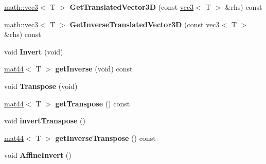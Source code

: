 \begin{DoxyCompactItemize}
\item 
\hypertarget{classmath_1_1mat44_ab01b2b5b923321768db4322b8b9c96cb}{
\hyperlink{classmath_1_1vec3}{math::vec3}$<$ T $>$ {\bfseries GetTranslatedVector3D} (const \hyperlink{classmath_1_1vec3}{vec3}$<$ T $>$ \&rhs) const }
\label{classmath_1_1mat44_ab01b2b5b923321768db4322b8b9c96cb}

\item 
\hypertarget{classmath_1_1mat44_ac1150e292e3e7640ae856c1918d26f4b}{
\hyperlink{classmath_1_1vec3}{math::vec3}$<$ T $>$ {\bfseries GetInverseTranslatedVector3D} (const \hyperlink{classmath_1_1vec3}{vec3}$<$ T $>$ \&rhs) const }
\label{classmath_1_1mat44_ac1150e292e3e7640ae856c1918d26f4b}

\item 
\hypertarget{classmath_1_1mat44_a0c01cca98e876ad0c8f5c125dfe1feaf}{
void {\bfseries Invert} (void)}
\label{classmath_1_1mat44_a0c01cca98e876ad0c8f5c125dfe1feaf}

\item 
\hypertarget{classmath_1_1mat44_a8fc8d1acc1ce9c9a3d6e79f072c1f8be}{
\hyperlink{classmath_1_1mat44}{mat44}$<$ T $>$ {\bfseries getInverse} (void) const }
\label{classmath_1_1mat44_a8fc8d1acc1ce9c9a3d6e79f072c1f8be}

\item 
\hypertarget{classmath_1_1mat44_adc6ecd07ee39f9fe10513df7f30155dd}{
void {\bfseries Transpose} (void)}
\label{classmath_1_1mat44_adc6ecd07ee39f9fe10513df7f30155dd}

\item 
\hypertarget{classmath_1_1mat44_a166e19fb7bb1d2b0d382df6fcf4acd49}{
\hyperlink{classmath_1_1mat44}{mat44}$<$ T $>$ {\bfseries getTranspose} () const }
\label{classmath_1_1mat44_a166e19fb7bb1d2b0d382df6fcf4acd49}

\item 
\hypertarget{classmath_1_1mat44_acc0eff54e102c8bd36f1b44f35cfcb14}{
void {\bfseries invertTranspose} ()}
\label{classmath_1_1mat44_acc0eff54e102c8bd36f1b44f35cfcb14}

\item 
\hypertarget{classmath_1_1mat44_ad08177a40c473bb105ec238b261c169e}{
\hyperlink{classmath_1_1mat44}{mat44}$<$ T $>$ {\bfseries getInverseTranspose} () const }
\label{classmath_1_1mat44_ad08177a40c473bb105ec238b261c169e}

\item 
\hypertarget{classmath_1_1mat44_a963c9290cea832685907da31e219b6eb}{
void {\bfseries AffineInvert} ()}
\label{classmath_1_1mat44_a963c9290cea832685907da31e219b6eb}


\end{DoxyCompactItemize}

